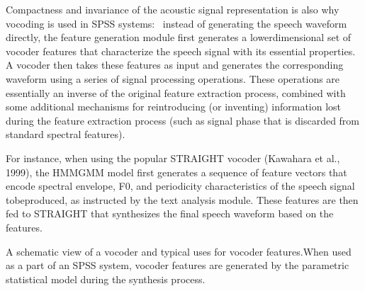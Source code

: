 \documentclass[letterpaper,10pt,english]{jupyterBook}
\begin{document}
\sphinxAtStartPar
Compactness and invariance of the acoustic signal representation is also
why vocoding is used in SPSS systems:  instead of generating the speech
waveform directly, the feature generation module first generates a
lower\sphinxhyphen{}dimensional set of vocoder features that characterize the speech
signal with its essential properties. A vocoder then takes these
features as input and generates the corresponding waveform using a
series of signal processing operations. These operations are essentially
an inverse of the original feature extraction process, combined with
some additional mechanisms for re\sphinxhyphen{}introducing (or inventing) information
lost during the feature extraction process (such as signal phase that is
discarded from standard spectral features).

\sphinxAtStartPar
For instance, when using the popular STRAIGHT vocoder (Kawahara et al.,
1999), the HMM\sphinxhyphen{}GMM model first generates a sequence of feature vectors
that encode spectral envelope, F0, and periodicity characteristics of
the speech signal to\sphinxhyphen{}be\sphinxhyphen{}produced, as instructed by the text analysis
module. These features are then fed to STRAIGHT that synthesizes the
final speech waveform based on the features.

\sphinxAtStartPar
{}
A schematic view of a vocoder and typical uses for vocoder features.When used as a part of an SPSS system, vocoder features are generated by
the parametric statistical model during the synthesis process.
\end{document}
